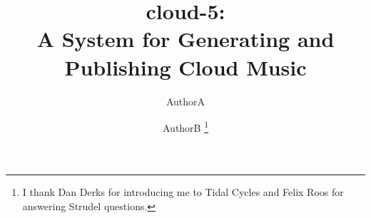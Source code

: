 \documentclass[runningheads,a4paper]{llncs}
\begin{document}
\mainmatter  %

\title{cloud-5:\\A System for Generating and Publishing Cloud Music}




\author{AuthorA\and AuthorB \thanks{I thank Dan Derks for introducing me to Tidal Cycles and Felix Roos for answering Strudel questions.}}
%


%
%
\end{document}
